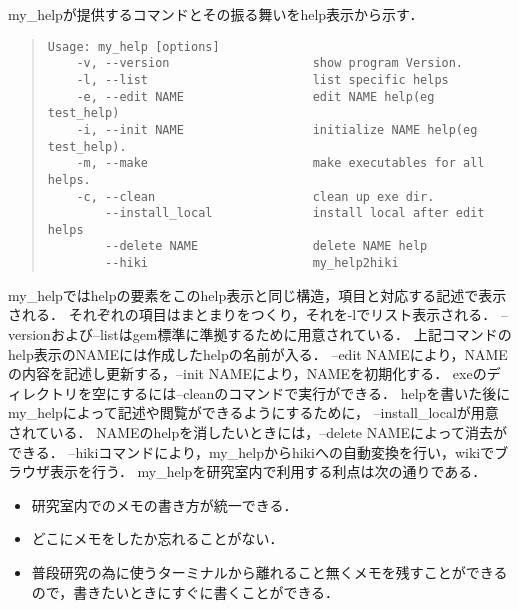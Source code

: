 my\_helpが提供するコマンドとその振る舞いをhelp表示から示す．
\begin{quote}\begin{verbatim}
Usage: my_help [options]
    -v, --version                    show program Version.
    -l, --list                       list specific helps
    -e, --edit NAME                  edit NAME help(eg test_help)
    -i, --init NAME                  initialize NAME help(eg test_help).
    -m, --make                       make executables for all helps.
    -c, --clean                      clean up exe dir.
        --install_local              install local after edit helps
        --delete NAME                delete NAME help
        --hiki                       my_help2hiki
\end{verbatim}\end{quote}
my\_helpではhelpの要素をこのhelp表示と同じ構造，項目と対応する記述で表示される．
それぞれの項目はまとまりをつくり，それを-lでリスト表示される．
--versionおよび--listはgem標準に準拠するために用意されている．
上記コマンドのhelp表示のNAMEには作成したhelpの名前が入る．
--edit NAMEにより，NAMEの内容を記述し更新する，--init NAMEにより，NAMEを初期化する．
exeのディレクトリを空にするには--cleanのコマンドで実行ができる．
helpを書いた後にmy\_helpによって記述や閲覧ができるようにするために，
--install\_localが用意されている．
NAMEのhelpを消したいときには，--delete NAMEによって消去ができる．
--hikiコマンドにより，my\_helpからhikiへの自動変換を行い，wikiでブラウザ表示を行う．
my\_helpを研究室内で利用する利点は次の通りである．
\begin{itemize}
\item 研究室内でのメモの書き方が統一できる．
\item どこにメモをしたか忘れることがない．
\item 普段研究の為に使うターミナルから離れること無くメモを残すことができるので，書きたいときにすぐに書くことができる．
\end{itemize}

